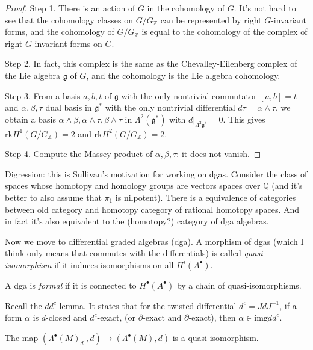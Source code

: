 \begin{proof}
Step 1. There is an action of $G$ in the
cohomology of $G$.
It's not hard to see that the cohomology
classes on $G/G_{\mathbb{Z}}$
can be represented by right $G$-invariant
forms,
and the cohomology of $G/G_{\mathbb{Z}}$ is
equal to the cohomology of the complex
of right-$G$-invariant forms on $G$.

\medskip\noindent
Step 2. In fact, this complex is the same as
the
Chevalley-Eilenberg complex of the Lie
algebra $\mathfrak{g}$ of $G$,
and the cohomology is the Lie algebra
cohomology.

\medskip\noindent
Step 3. From a basis $a,b,t$ of
$\mathfrak{g}$ with the only nontrivial
commutator $[a,b]=t$ and $\alpha,\beta,\tau$
dual basis in $\mathfrak{g}^*$
with the only nontrivial differential
$d\tau=\alpha\wedge\tau$,
we obtain a basis $\alpha \wedge \beta,
\alpha \wedge \tau, \beta \wedge \tau$
in $\Lambda^2(\mathfrak{g}^*)$ with
$d|_{\Lambda^2\mathfrak{g}^*}=0$.
This gives $\text{rk}
H^1(G/G_{\mathbb{Z}})=2$
and $\text{rk}H^2(G/G_{\mathbb{Z}})=2$.

\medskip\noindent
Step 4. Compute the Massey product of
$\alpha,\beta,\tau$:
it does not vanish.
\end{proof}

\medskip\noindent
Digression: this is Sullivan's motivation for
working on dgas.
Consider the class of spaces whose homotopy
and homology
groups are vectors spaces over $\mathbb{Q}$
(and it's better to also assume that $\pi_1$
is nilpotent).
There is a equivalence of categories between
old category
and homotopy category of rational homotopy
spaces.
And in fact it's also equivalent to the
(homotopy?)
category of dga algebras.

\medskip\noindent
Now we move to differential graded algebras
(dga).
A morphism of dgas (which I think only means
that commutes with
the differentials) is called {\it
quasi-isomorphism} if it
induces isomorphisms on all $H^i(A^\bullet)$.

A dga is {\it formal} if it is connected to
$H^\bullet(A^\bullet)$
by a chain of quasi-isomorphisms.

Recall the $dd^c$-lemma. It states that for
the twisted
differential $d^c=Jd J^{-1}$, if a form
$\alpha$ is $d$-closed and $d^c$-exact,
(or $\partial$-exact and
$\overline{\partial}$-exact),
then $\alpha\in \text{img}dd^c$.

\begin{lemma}
\label{lemma-quasi-isomorphisms}
The map $(\Lambda^\bullet(M)_{d^c},d)\to
(\Lambda^\bullet(M),d)$
is a quasi-isomorphism.
\end{lemma}

